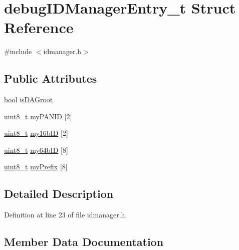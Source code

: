 \hypertarget{structdebug_i_d_manager_entry__t}{}\section{debug\+I\+D\+Manager\+Entry\+\_\+t Struct Reference}
\label{structdebug_i_d_manager_entry__t}


{\ttfamily \#include $<$idmanager.\+h$>$}

\subsection*{Public Attributes}
\begin{DoxyCompactItemize}
\item 
\hyperlink{_p_e___types_8h_a97a80ca1602ebf2303258971a2c938e2}{bool} \hyperlink{structdebug_i_d_manager_entry__t_a406a9dbcadf394e7c5c87d929844142d}{is\+D\+A\+Groot}
\item 
\hyperlink{_p_e___types_8h_aba7bc1797add20fe3efdf37ced1182c5}{uint8\+\_\+t} \hyperlink{structdebug_i_d_manager_entry__t_a7b54cf7f9eae10784e09642b4b1f4551}{my\+P\+A\+N\+ID} \mbox{[}2\mbox{]}
\item 
\hyperlink{_p_e___types_8h_aba7bc1797add20fe3efdf37ced1182c5}{uint8\+\_\+t} \hyperlink{structdebug_i_d_manager_entry__t_aa3beb13af72cc70268576eeb8ef8f5a6}{my16b\+ID} \mbox{[}2\mbox{]}
\item 
\hyperlink{_p_e___types_8h_aba7bc1797add20fe3efdf37ced1182c5}{uint8\+\_\+t} \hyperlink{structdebug_i_d_manager_entry__t_a91a9cf63e3854e805a3d6d8382362968}{my64b\+ID} \mbox{[}8\mbox{]}
\item 
\hyperlink{_p_e___types_8h_aba7bc1797add20fe3efdf37ced1182c5}{uint8\+\_\+t} \hyperlink{structdebug_i_d_manager_entry__t_a0b67c04bdc79d66da441905cd40bf130}{my\+Prefix} \mbox{[}8\mbox{]}
\end{DoxyCompactItemize}


\subsection{Detailed Description}


Definition at line 23 of file idmanager.\+h.



\subsection{Member Data Documentation}
